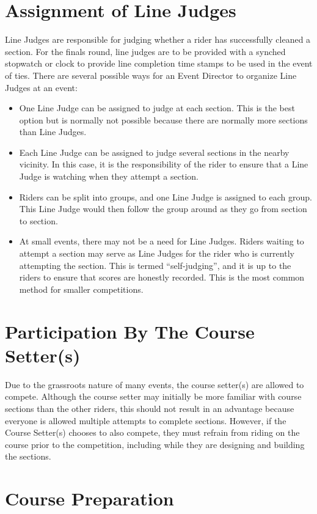\section{Assignment of Line Judges}
Line Judges are responsible for judging whether a rider has successfully cleaned a section.
For the finals round, line judges are to be provided with a synched stopwatch or clock to provide line completion time stamps to be used in the event of ties.
There are several possible ways for an Event Director to organize Line Judges at an event:
\begin{itemize}
\item One Line Judge can be assigned to judge at each section.
This is the best option but is normally not possible because there are normally more sections than Line Judges.
\item Each Line Judge can be assigned to judge several sections in the nearby vicinity.
In this case, it is the responsibility of the rider to ensure that a Line Judge is watching when they attempt a section.
\item Riders can be split into groups, and one Line Judge is assigned to each group.
This Line Judge would then follow the group around as they go from section to section.
\item At small events, there may not be a need for Line Judges.
Riders waiting to attempt a section may serve as Line Judges for the rider who is currently attempting the section.
This is termed ``self-judging'', and it is up to the riders to ensure that scores are honestly recorded.
This is the most common method for smaller competitions.
\end{itemize}

\section{Participation By The Course Setter(s)}

Due to the grassroots nature of many events, the course setter(s) are allowed to compete.
Although the course setter may initially be more familiar with course sections than the other riders, this should not result in an advantage because everyone is allowed multiple attempts to complete sections.
However, if the Course Setter(s) chooses to also compete, they must refrain from riding on the course prior to the competition, including while they are designing and building the sections.

\section{Course Preparation}

